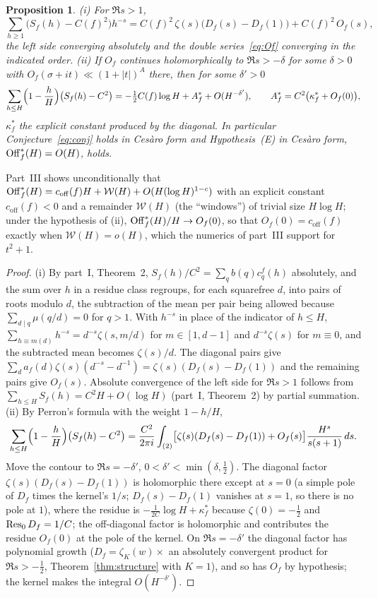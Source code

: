\documentclass[11pt,a4paper]{article}
\newtheorem{proposition}[theorem]{Proposition}
\theoremstyle{remark}\newtheorem{remark}[theorem]{Remark}
\begin{document}
\begin{proposition}\label{prop:Of}
(i) For $\Re s>1$,
\[
\sum_{h\ge1}\bigl(S_f(h)-C(f)^2\bigr)h^{-s}=C(f)^2\,\zeta(s)\bigl(D_f(s)-D_f(1)\bigr)+C(f)^2\,O_f(s),
\]
the left side converging absolutely and the double series~\eqref{eq:Of} converging in the indicated order.
(ii) If $O_f$ continues holomorphically to $\Re s>-\delta$ for some $\delta>0$ with $O_f(\sigma+it)\ll(1+|t|)^{A}$
there, then for some $\delta'>0$
\[
\sum_{h\le H}\Bigl(1-\frac hH\Bigr)\bigl(S_f(h)-C^2\bigr)=-\tfrac12C(f)\log H+A_f^{\ast}+O(H^{-\delta'}),
\qquad A_f^\ast=C^2\bigl(\kappa^\ast_f+O_f(0)\bigr),
\]
$\kappa^\ast_f$ the explicit constant produced by the diagonal. In particular Conjecture~\eqref{eq:conj} holds
in Ces\`aro form and Hypothesis~(E) in Ces\`aro form, $\mathrm{Off}^\ast_f(H)=O(H)$, holds.
\end{proposition}
Part~III shows unconditionally that $\mathrm{Off}^\ast_f(H)=c_{\mathrm{off}}(f)H+\mathcal W(H)+O(H(\log H)^{1-c})$ with an explicit
constant $c_{\mathrm{off}}(f)<0$ and a remainder $\mathcal W(H)$ (the ``windows'') of trivial size $H\log H$; under the
hypothesis of (ii), $\mathrm{Off}^\ast_f(H)/H\to O_f(0)$, so that $O_f(0)=c_{\mathrm{off}}(f)$ exactly when $\mathcal W(H)=o(H)$, which
the numerics of part~III support for $t^2+1$.
\begin{proof}
(i) By part~I, Theorem~2, $S_f(h)/C^2=\sum_qb(q)c^f_q(h)$ absolutely, and the sum over $h$ in a residue class
regroups, for each squarefree $d$, into pairs of roots modulo $d$, the subtraction of the mean per pair being
allowed because $\sum_{d\mid q}\mu(q/d)=0$ for $q>1$. With $h^{-s}$ in place of the indicator of $h\le H$,
$\sum_{h\equiv m(d)}h^{-s}=d^{-s}\zeta(s,m/d)$ for $m\in[1,d-1]$ and $d^{-s}\zeta(s)$ for $m\equiv0$, and the
subtracted mean becomes $\zeta(s)/d$. The diagonal pairs give $\sum_da_f(d)\zeta(s)(d^{-s}-d^{-1})=\zeta(s)(D_f(s)-D_f(1))$
and the remaining pairs give $O_f(s)$. Absolute convergence of the left side for $\Re s>1$ follows from
$\sum_{h\le H}S_f(h)=C^2H+O(\log H)$ (part~I, Theorem~2) by partial summation.
(ii) By Perron's formula with the weight $1-h/H$,
\[
\sum_{h\le H}\Bigl(1-\frac hH\Bigr)\bigl(S_f(h)-C^2\bigr)=\frac{C^2}{2\pi i}\int_{(2)}\bigl[\zeta(s)(D_f(s)-D_f(1))+O_f(s)\bigr]\frac{H^{s}}{s(s+1)}\,ds .
\]
Move the contour to $\Re s=-\delta'$, $0<\delta'<\min(\delta,\tfrac12)$. The diagonal factor
$\zeta(s)(D_f(s)-D_f(1))$ is holomorphic there except at $s=0$ (a simple pole of $D_f$ times the kernel's
$1/s$; $D_f(s)-D_f(1)$ vanishes at $s=1$, so there is no pole at $1$), where the residue is
$-\tfrac1{2C}\log H+\kappa^\ast_f$ because $\zeta(0)=-\tfrac12$ and $\operatorname*{Res}_0D_f=1/C$; the off-diagonal factor is
holomorphic and contributes the residue $O_f(0)$ at the pole of the kernel. On $\Re s=-\delta'$ the diagonal
factor has polynomial growth ($D_f=\zeta_K(w)\times$ an absolutely convergent product for $\Re s>-\tfrac12$,
Theorem~\ref{thm:structure} with $K=1$), and so has $O_f$ by hypothesis; the kernel makes the integral
$O(H^{-\delta'})$.
\end{proof}
\end{document}
